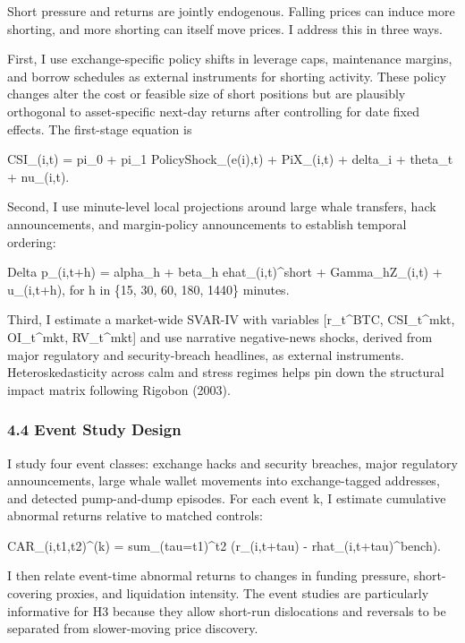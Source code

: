 \documentclass[
]{article}
\begin{document}
Short pressure and returns are jointly endogenous. Falling prices can
induce more shorting, and more shorting can itself move prices. I
address this in three ways.

First, I use exchange-specific policy shifts in leverage caps,
maintenance margins, and borrow schedules as external instruments for
shorting activity. These policy changes alter the cost or feasible size
of short positions but are plausibly orthogonal to asset-specific
next-day returns after controlling for date fixed effects. The
first-stage equation is

CSI\_(i,t) = pi\_0 + pi\_1 PolicyShock\_(e(i),t) +
Pi\textquotesingle X\_(i,t) + delta\_i + theta\_t + nu\_(i,t).

Second, I use minute-level local projections around large whale
transfers, hack announcements, and margin-policy announcements to
establish temporal ordering:

Delta p\_(i,t+h) = alpha\_h + beta\_h ehat\_(i,t)\^{}short +
Gamma\_h\textquotesingle Z\_(i,t) + u\_(i,t+h), for h in \{15, 30, 60,
180, 1440\} minutes.

Third, I estimate a market-wide SVAR-IV with variables {[}r\_t\^{}BTC,
CSI\_t\^{}mkt, OI\_t\^{}mkt, RV\_t\^{}mkt{]}\textquotesingle{} and use
narrative negative-news shocks, derived from major regulatory and
security-breach headlines, as external instruments. Heteroskedasticity
across calm and stress regimes helps pin down the structural impact
matrix following Rigobon (2003).

\subsubsection{4.4 Event Study Design}\label{44-event-study-design}

I study four event classes: exchange hacks and security breaches, major
regulatory announcements, large whale wallet movements into
exchange-tagged addresses, and detected pump-and-dump episodes. For each
event k, I estimate cumulative abnormal returns relative to matched
controls:

CAR\_(i,t1,t2)\^{}(k) = sum\_(tau=t1)\^{}t2 (r\_(i,t+tau) -
rhat\_(i,t+tau)\^{}bench).

I then relate event-time abnormal returns to changes in funding
pressure, short-covering proxies, and liquidation intensity. The event
studies are particularly informative for H3 because they allow short-run
dislocations and reversals to be separated from slower-moving price
discovery.
\end{document}
